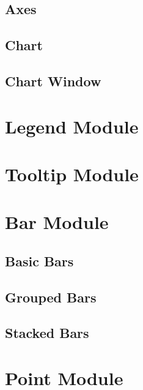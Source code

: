 \subsection{Axes}



\subsection{Chart}


\subsection{Chart Window}


\section{Legend Module}

\section{Tooltip Module}

\section{Bar Module}

\subsection{Basic Bars}

\subsection{Grouped Bars}

\subsection{Stacked Bars}

\section{Point Module}